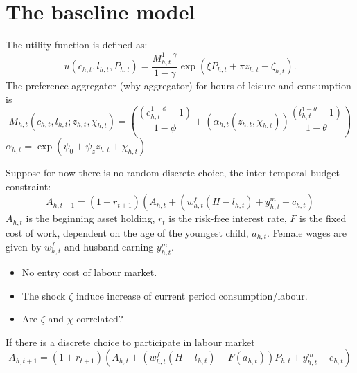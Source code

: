 \section{The baseline model}

The utility function is defined as:
\[ u(c_{h,t},l_{h,t},P_{h,t}) = \frac{M^{1-\gamma}_{h,t}}{1 - \gamma} \exp{(\xi P_{h,t} + \pi z_{h,t} + \zeta_{h,t} )} .\]
The preference aggregator (why aggregator) for hours of leisure and consumption is
\[ M_{h,t}(c_{h,t},l_{h,t};z_{h,t},\chi_{h,t}) = \left( \frac{(c_{h,t}^{1 - \phi} - 1)}{1 - \phi} + (\alpha_{h,t}(z_{h,t},\chi_{h,t})) \frac{(l_{h,t}^{1 - \theta} -1)}{ 1 - \theta}\right) \]
$\alpha_{h,t}= \exp{(\psi_0 + \psi_z z_{h,t} + \chi_{h,t})}$

Suppose for now there is no random discrete choice, the inter-temporal budget constraint:
\[ A_{h,t+1} = (1 + r_{t+1}) \left( A_{h,t} + \left(w_{h,t}^f(H-l_{h,t}) + y_{h,t}^m - c_{h,t} \right)\]
$A_{h,t}$ is the beginning asset holding, $r_t$ is the risk-free interest rate, $F$ is the fixed cost of work, dependent on the age of the youngest child, $a_{h,t}$. Female wages are given by $w_{h,t}^f$ and husband earning $y_{h,t}^m$.


\begin{itemize}
  \item No entry cost of labour market.
  \item The shock $\zeta$ induce increase of current period consumption/labour.
  \item Are $\zeta$ and $\chi$ correlated?
\end{itemize}

If there is a discrete choice to participate in labour market
\[ A_{h,t+1} = (1 + r_{t+1}) \left( A_{h,t} + \left(w_{h,t}^f(H-l_{h,t}) - F(a_{h,t}) \right)P_{h,t} + y_{h,t}^m - c_{h,t} \right)\]
